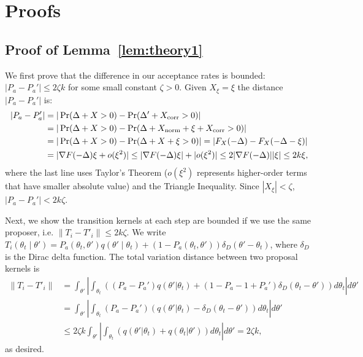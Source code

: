 \documentclass{article}
\begin{document}
\section{Proofs}\label{app:proofs}

\subsection{Proof of Lemma~\ref{lem:theory1}}\label{app:theory1}

We first prove that the difference in our acceptance rates is bounded: $|P_a - P_a'| \leq 2\zeta k$
for some small constant $\zeta > 0$. Given $X_\xi = \xi$ the distance $|P_a - P_a'|$ is:
\begin{align*}
|P_a - P_a'| &= |\Pr(\Delta + X >0) - \Pr(\Delta' + X_{\rm corr} > 0)|\\
& = | \Pr (\Delta + X > 0) - \Pr (\Delta + X_{\rm norm} + \xi + X_{\rm corr} >0) |    \\
&= |\Pr (\Delta + X > 0) -\Pr(\Delta + X + \xi >0)| = |F_X(-\Delta)- F_X(-\Delta - \xi)| \\
&= |\nabla F(-\Delta) \xi + o(\xi^2)| \leq  |\nabla F(-\Delta) \xi| +| o(\xi^2)| \leq 2|\nabla F(-\Delta)| |\xi| \leq 2k \xi,
\end{align*}
where the last line uses Taylor's Theorem ($o(\xi^2)$ represents higher-order terms that have
smaller absolute value) and the Triangle Inequality.  Since $|X_\xi| < \zeta$, $|P_a - P_a'| <
2k\zeta$.

Next, we show the transition kernels at each step are bounded if we use the same proposer, i.e.
$\|T_i - T'_i\| \leq 2k\zeta$. We write $T_i(\theta_t \mid \theta') = P_a(\theta_t, \theta')
q(\theta'\mid \theta_t) + (1-P_a(\theta_t,\theta')) \delta_D(\theta' - \theta_t)$, where $\delta_D$
is the Dirac delta function. The total variation distance between two proposal kernels is
\begin{align*}
\|T_i - T'_i \| &= \int_{\theta'} \left| \int_{\theta_t}((P_a-P_a') q(\theta'|\theta_t) + (1-P_a - 1+P_a') \delta_D(\theta_t -\theta')) d\theta_t  \right| d\theta' \\
& = \int_{\theta'} \left| \int_{\theta_t} (P_a- P_a')(q(\theta'|\theta_t) - \delta_D(\theta_t - \theta')) d\theta_t \right|  d\theta'\\ 
& \leq 2 \zeta k \int_{\theta'} \left| \int_{\theta_t}(q(\theta'|\theta_t) + q(\theta_t|\theta'))  d\theta_t \right| d\theta'= 2 \zeta k,
\end{align*}
as desired.
\end{document}
